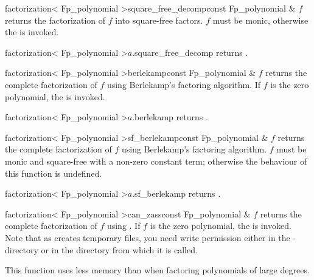 \begin{fcode}{factorization< Fp_polynomial >}{square_free_decomp}{const Fp_polynomial & $f$}
  returns the factorization of $f$ into square-free factors.  $f$ must be monic, otherwise the
  \LEH is invoked.
\end{fcode}

\begin{cfcode}{factorization< Fp_polynomial >}{$a$.square_free_decomp}{}
  returns .
\end{cfcode}



\begin{fcode}{factorization< Fp_polynomial >}{berlekamp}{const Fp_polynomial & $f$}
  returns the complete factorization of $f$ using Berlekamp's factoring algorithm.  If $f$ is
  the zero polynomial, the \LEH is invoked.
\end{fcode}

\begin{cfcode}{factorization< Fp_polynomial >}{$a$.berlekamp}{}
  returns .
\end{cfcode}

\begin{fcode}{factorization< Fp_polynomial >}{sf_berlekamp}{const Fp_polynomial & $f$}
  returns the complete factorization of $f$ using Berlekamp's factoring algorithm.  $f$ must be
  monic and square-free with a non-zero constant term; otherwise the behaviour of this function
  is undefined.
\end{fcode}

\begin{cfcode}{factorization< Fp_polynomial >}{$a$.sf_berlekamp}{}
  returns .
\end{cfcode}



\begin{fcode}{factorization< Fp_polynomial >}{can_zass}{const Fp_polynomial & $f$}
  returns the complete factorization of $f$ using .  If $f$ is the zero
  polynomial, the \LEH is invoked.  Note that as  creates temporary files, you need
  write permission either in the -directory or in the directory from which it is
  called.
  
  This function uses less memory than  when factoring polynomials of large
  degrees.
\end{fcode}

